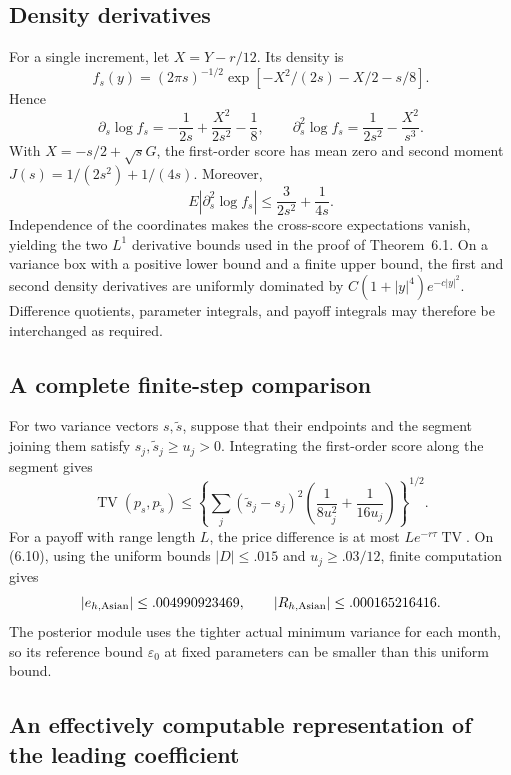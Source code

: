 \subsection{Density derivatives}

For a single increment, let \(X=Y-r/12\). Its density is
\[
f_s(y)=(2\pi s)^{-1/2}
\exp[-X^2/(2s)-X/2-s/8].
\]
Hence
\[
\partial_s\log f_s=-\frac1{2s}+\frac{X^2}{2s^2}-\frac18,\qquad
\partial_s^2\log f_s=\frac1{2s^2}-\frac{X^2}{s^3}.
\]
With \(X=-s/2+\sqrt{s}G\), the first-order score has mean zero and second moment
\(J(s)=1/(2s^2)+1/(4s)\). Moreover,
\[
E|\partial_s^2\log f_s|
\le\frac3{2s^2}+\frac1{4s}.
\]
Independence of the coordinates makes the cross-score expectations vanish, yielding
the two \(L^1\) derivative bounds used in the proof of Theorem~6.1.
On a variance box with a positive lower bound and a finite upper bound, the first and
second density derivatives are uniformly dominated by
\(C(1+|y|^4)e^{-c|y|^2}\).
Difference quotients, parameter integrals, and payoff integrals may therefore be
interchanged as required.

\subsection{A complete finite-step comparison}

For two variance vectors \(s,\tilde s\), suppose that their endpoints and the segment
joining them satisfy \(s_j,\tilde s_j\ge u_j>0\).
Integrating the first-order score along the segment gives
\[
\operatorname{TV}(p_s,p_{\tilde s})
\le\left\{
\sum_j(\tilde s_j-s_j)^2
\left(\frac1{8u_j^2}+\frac1{16u_j}\right)
\right\}^{1/2}.
\tag{D.1}
\]
For a payoff with range length \(L\), the price difference is at most
\(Le^{-r\tau}\operatorname{TV}\).
On (6.10), using the uniform bounds \(|D|\le.015\) and \(u_j\ge.03/12\),
finite computation gives
\[
|e_{h,\rm Asian}|\le.004990923469,\qquad
|R_{h,\rm Asian}|\le.000165216416.
\]
The posterior module uses the tighter actual minimum variance for each month, so its
reference bound \(\varepsilon_0\) at fixed parameters can be smaller than this uniform bound.

\subsection{An effectively computable representation of the leading coefficient}

